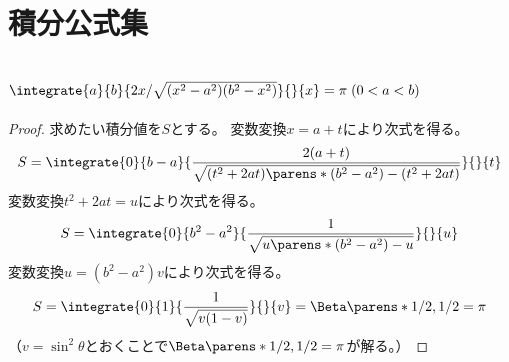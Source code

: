     \chapter{積分公式集}
        \section{\texorpdfstring{$\integrate{a}{b}{2x/\sqrt{(x^2-a^2)(b^2-x^2)}}{}{x}=\pi\;(0<a<b)$}{∫\_a\string^b 2x/sqrt((x\string^2-a\string^2)(b\string^2-x\string^2)) = π (0<a<b)}}
            \begin{proof}
                求めたい積分値を$S$とする。
                変数変換$x=a+t$により次式を得る。
                \[ S = \integrate{0}{b-a}{\frac{2(a+t)}{\sqrt{(t^2+2at)\parens*{(b^2-a^2)-(t^2+2at)}}}}{}{t} \]
                変数変換$t^2+2at=u$により次式を得る。
                \[ S = \integrate{0}{b^2-a^2}{\frac{1}{\sqrt{u\parens*{(b^2-a^2)-u}}}}{}{u} \]
                変数変換$u=(b^2-a^2)v$により次式を得る。
                \[ S = \integrate{0}{1}{\frac{1}{\sqrt{v(1-v)}}}{}{v} = \Beta\parens*{1/2,1/2} = \pi \]
                （$v=\sin^2\theta$とおくことで$\Beta\parens*{1/2,1/2} = \pi$が解る。）
            \end{proof}